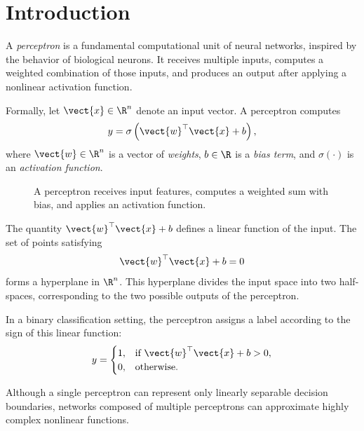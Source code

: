 \chapter{Introduction}

A \emph{perceptron} is a fundamental computational unit of neural networks, inspired by the behavior of biological neurons. It receives multiple inputs, computes a weighted combination of those inputs, and produces an output after applying a nonlinear activation function.

Formally, let $\vect{x} \in \R^n$ denote an input vector. A perceptron computes
\[
    y = \sigma\left(\vect{w}^\top \vect{x} + b\right),
\]
where $\vect{w} \in \R^n$ is a vector of \emph{weights}, $b \in \R$ is a \emph{bias term}, and $\sigma(\cdot)$ is an \emph{activation function}.

\begin{figure}[tb]
    \centering
    
    \caption{A perceptron receives input features, computes a weighted sum with bias, and applies an activation function.}
\end{figure}

The quantity $\vect{w}^\top \vect{x} + b$ defines a linear function of the input. The set of points satisfying
\[
    \vect{w}^\top \vect{x} + b = 0
\]
forms a hyperplane in $\R^n$. This hyperplane divides the input space into two half-spaces, corresponding to the two possible outputs of the perceptron.

In a binary classification setting, the perceptron assigns a label according to the sign of this linear function:
\[
    y =
    \begin{cases}
        1, & \text{if } \vect{w}^\top \vect{x} + b > 0, \\
        0, & \text{otherwise.}
    \end{cases}
\]

Although a single perceptron can represent only linearly separable decision boundaries, networks composed of multiple perceptrons can approximate highly complex nonlinear functions.
